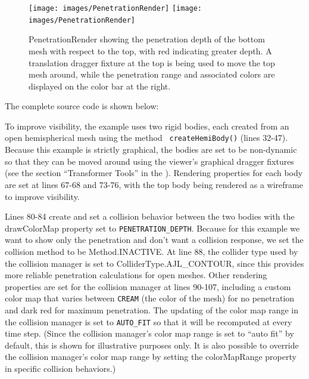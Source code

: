 \begin{figure}[ht]
\begin{center}
\iflatexml
 \texttt{[image: images/PenetrationRender]}
\else
 \texttt{[image: images/PenetrationRender]}
\fi
\end{center}
\caption{PenetrationRender showing the penetration depth of the bottom
mesh with respect to the top, with red indicating greater depth.
A translation dragger fixture at the top is being used to 
move the top mesh around, while the penetration range and
associated colors are displayed on the color bar at the right.}
\label{PenetrationRender:fig}
\end{figure}

The complete source code is shown below:
%
\lstset{numbers=left}

\lstset{numbers=none} 

To improve visibility, the example uses two rigid bodies, each created
from an open hemispherical mesh using the method {\tt
createHemiBody()} (lines 32-47). Because this example is strictly
graphical, the bodies are set to be non-dynamic so that they can be
moved around using the viewer's graphical dragger fixtures (see the
section ``Transformer Tools'' in the
). 
Rendering properties for each body are set at lines
67-68 and 73-76, with the top body being rendered as a wireframe to
improve visibility.

Lines 80-84 create and set a collision behavior between the two bodies
with the {\sf drawColorMap} property set to
{\tt PENETRATION\_DEPTH}. Because for this example we
want to show only the penetration and don't want a collision response,
we set the collision method to be %
{Method.INACTIVE}.
At line 88, the collider type used by the collision manager is set to
%
{ColliderType.AJL\_CONTOUR}, since this provides more reliable
penetration calculations for open meshes.  Other rendering properties
are set for the collision manager at lines 90-107, including a custom
color map that varies between {\tt CREAM} (the color of the mesh) for
no penetration and dark red for maximum penetration. The updating of
the color map range in the collision manager is set to {\tt AUTO\_FIT}
so that it will be recomputed at every time step. (Since the collision
manager's color map range is set to ``auto fit'' by default, this is
shown for illustrative purposes only. It is also possible to override
the collision manager's color map range by setting the {\sf
colorMapRange} property in specific collision behaviors.)


